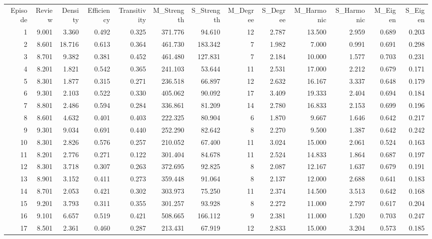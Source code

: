 \begin{tabular}{rrrrrrrrrrrrr}
Episode & Review & Density & Efficiency & Transitivity & M_Strength & S_Strength & M_Degree & S_Degree & M_Harmonic & S_Harmonic & M_Eigen & S_Eigen \\
1 & 9.001 & 3.360 & 0.492 & 0.325 & 371.776 & 94.610 & 12 & 2.787 & 13.500 & 2.959 & 0.689 & 0.203 \\
2 & 8.601 & 18.716 & 0.613 & 0.364 & 461.730 & 183.342 & 7 & 1.982 & 7.000 & 0.991 & 0.691 & 0.298 \\
3 & 8.701 & 9.382 & 0.381 & 0.452 & 461.480 & 127.831 & 7 & 2.184 & 10.000 & 1.577 & 0.703 & 0.231 \\
4 & 8.201 & 1.821 & 0.542 & 0.365 & 241.103 & 53.644 & 11 & 2.531 & 17.000 & 2.212 & 0.679 & 0.171 \\
5 & 8.301 & 1.877 & 0.315 & 0.271 & 236.518 & 66.897 & 12 & 2.632 & 16.167 & 3.337 & 0.648 & 0.179 \\
6 & 9.301 & 2.103 & 0.522 & 0.330 & 405.062 & 90.092 & 17 & 3.409 & 19.333 & 2.404 & 0.694 & 0.184 \\
7 & 8.801 & 2.486 & 0.594 & 0.284 & 336.861 & 81.209 & 14 & 2.780 & 16.833 & 2.153 & 0.699 & 0.196 \\
8 & 8.601 & 4.632 & 0.401 & 0.403 & 222.325 & 80.904 & 6 & 1.870 & 9.667 & 1.646 & 0.642 & 0.217 \\
9 & 9.301 & 9.034 & 0.691 & 0.440 & 252.290 & 82.642 & 8 & 2.270 & 9.500 & 1.387 & 0.642 & 0.242 \\
10 & 8.301 & 2.826 & 0.576 & 0.257 & 210.052 & 67.400 & 11 & 3.024 & 15.000 & 2.061 & 0.524 & 0.163 \\
11 & 8.201 & 2.776 & 0.271 & 0.122 & 301.404 & 84.678 & 11 & 2.524 & 14.833 & 1.864 & 0.687 & 0.197 \\
12 & 8.301 & 3.718 & 0.307 & 0.263 & 372.695 & 92.825 & 8 & 2.087 & 12.167 & 1.637 & 0.679 & 0.191 \\
13 & 8.901 & 3.152 & 0.411 & 0.273 & 359.448 & 91.064 & 8 & 2.137 & 12.000 & 2.688 & 0.641 & 0.183 \\
14 & 8.701 & 2.053 & 0.421 & 0.302 & 303.973 & 75.250 & 11 & 2.374 & 14.500 & 3.513 & 0.642 & 0.168 \\
15 & 9.201 & 3.793 & 0.311 & 0.355 & 301.257 & 93.928 & 8 & 2.272 & 11.000 & 2.797 & 0.617 & 0.204 \\
16 & 9.101 & 6.657 & 0.519 & 0.421 & 508.665 & 166.112 & 9 & 2.381 & 11.000 & 1.520 & 0.703 & 0.247 \\
17 & 8.501 & 2.361 & 0.460 & 0.287 & 213.431 & 67.919 & 12 & 2.833 & 15.000 & 3.204 & 0.573 & 0.185 \\

\end{tabular}
